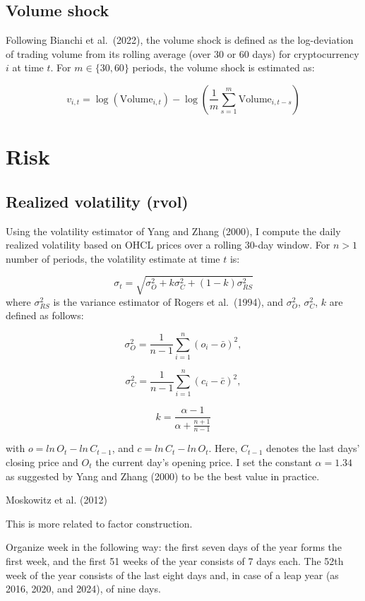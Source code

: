 \documentclass[
  11pt,
  a4paper,
  openany]{scrreprt}
\begin{document}
\subsection{Volume shock}\label{volume-shock}

Following Bianchi et al.~(2022), the volume shock is defined as the
log-deviation of trading volume from its rolling average (over 30 or 60
days) for cryptocurrency \(i\) at time \(t\). For \(m \in \{30, 60\}\)
periods, the volume shock is estimated as:

\[
v_{i,t} = \log(\text{Volume}_{i,t}) - \log\left( \frac{1}{m} \sum_{s=1}^{m} \text{Volume}_{i,t-s} \right)
\]

\section{Risk}\label{risk}

\subsection{Realized volatility (rvol)}\label{realized-volatility-rvol}

Using the volatility estimator of Yang and Zhang (2000), I compute the
daily realized volatility based on OHCL prices over a rolling 30-day
window. For \(n > 1\) number of periods, the volatility estimate at time
\(t\) is:

\[
\sigma_t = \sqrt{\sigma^2_O + k\sigma^2_C + (1 - k)\sigma^2_{RS}}
\] where \(\sigma^2_{RS}\) is the variance estimator of Rogers et
al.~(1994), and \(\sigma^2_O\), \(\sigma^2_C\), \(k\) are defined as
follows:

\[
\sigma^2_O = \frac{1}{n-1}\sum\limits_{i=1}^n(o_i - \bar o)^2,
\]

\[
\sigma^2_C = \frac{1}{n-1}\sum\limits_{i=1}^n(c_i - \bar c)^2,
\]

\[
k = \frac{\alpha -1}{\alpha + \frac{n+1}{n-1}}
\]

with \(o = ln\,O_t - ln\,C_{t-1}\), and \(c = ln\,C_t - ln\,O_t\). Here,
\(C_{t-1}\) denotes the last days' closing price and \(O_t\) the current
day's opening price. I set the constant \(\alpha = 1.34\) as suggested
by Yang and Zhang (2000) to be the best value in practice.

Moskowitz et al. (2012)

This is more related to factor construction.

Organize week in the following way: the first seven days of the year
forms the first week, and the first 51 weeks of the year consists of 7
days each. The 52th week of the year consists of the last eight days
and, in case of a leap year (as 2016, 2020, and 2024), of nine days.
\end{document}
